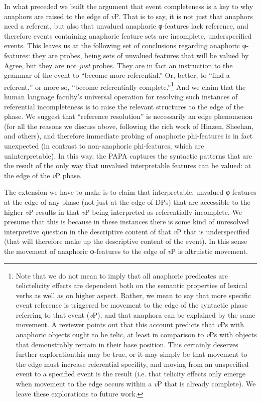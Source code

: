 In what preceded we built the argument that event completeness is a key to why anaphors are raised to the edge of \textit{v}P. That is to say, it is not just that anaphors need a referent, but also that unvalued anaphoric φ-features lack reference, and therefore events containing anaphoric feature sets are incomplete, underspecified events. This leaves us at the following set of conclusions regarding anaphoric φ-features: they are probes, being sets of unvalued features that will be valued by Agree, but they are not \textit{just} probes. They are in fact an instruction to the grammar of the event to ``become more referential.'' Or, better, to ``find a referent,'' or more so, ``become referentially complete.''\footnote{Note that we do not mean to imply that all anaphoric predicates are telic\textemdash telicity effects are dependent both on the semantic properties of lexical verbs as well as on higher aspect. Rather, we mean to say that more specific event reference is triggered be movement to the edge of the syntactic phase referring to that event (\textit{v}P), and that anaphora can be explained by the same movement. A reviewer points out that this account predicts that \textit{v}Ps with anaphoric objects ought to be telic, at least in comparison to \textit{v}Ps with objects that demonstrably remain in their base position. This certainly deserves further exploration\textemdash this may be true, or it may simply be that movement to the edge must increase referential specifity, and moving from an unspecified event to a specified event is the result (i.e. that telicity effects only emerge when movement to the edge occurs within a \textit{v}P that is already complete). We leave these explorations to future work.} And we claim that the human language faculty's universal operation for resolving such instances of referential incompleteness is to raise the relevant structures to the edge of the phase. We suggest that ``reference resolution'' is necessarily an edge phenomenon (for all the reasons we discuss above, following the rich work of Hinzen, Sheehan, and others), and therefore immediate probing of anaphoric phi-features is in fact unexpected (in contrast to non-anaphoric phi-features, which are uninterpretable). In this way, the PAPA captures the syntactic patterns that are the result of the only way that unvalued interpretable features can be valued: at the edge of the \textit{v}P phase.

The extension we have to make is to claim that interpretable, unvalued φ-features at the edge of any phase (not just at the edge of DPs) that are accessible to the higher \textit{v}P results in that \textit{v}P being interpreted as referentially incomplete. We presume that this is because in these instances there is some kind of unresolved interpretive question in the descriptive content of that \textit{v}P that is underspecified (that will therefore make up the descriptive content of the event). In this sense the movement of anaphoric φ-features to the edge of \textit{v}P is altruistic movement. 

